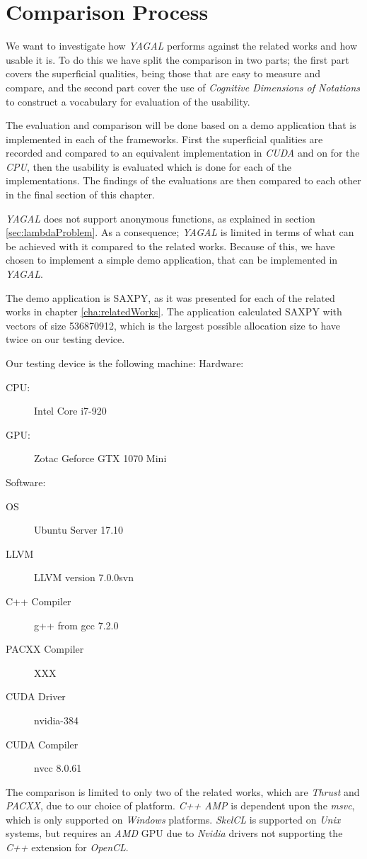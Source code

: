 \section{Comparison Process}
We want to investigate how \textit{YAGAL} performs against the related works and how usable it is. To do this we have split the comparison in two parts; the first part covers the superficial qualities, being those that are easy to measure and compare, and the second part cover the use of \textit{Cognitive Dimensions of Notations} to construct a vocabulary for evaluation of the usability.

The evaluation and comparison will be done based on a demo application that is implemented in each of the frameworks. First the superficial qualities are recorded and compared to an equivalent implementation in \textit{CUDA} and on for the \textit{CPU}, then the usability is evaluated which is done for each of the implementations. The findings of the evaluations are then compared to each other in the final section of this chapter.

\textit{YAGAL} does not support anonymous functions, as explained in section \ref{sec:lambdaProblem}. As a consequence; \textit{YAGAL} is limited in terms of what can be achieved with it compared to the related works. Because of this, we have chosen to implement a simple demo application, that can be implemented in \textit{YAGAL}. 

The demo application is SAXPY, as it was presented for each of the related works in chapter \ref{cha:relatedWorks}. The application calculated SAXPY with vectors of size 536870912, which is the largest possible allocation size to have twice on our testing device.

Our testing device is the following machine:
Hardware:
\begin{description}
\item[CPU:] Intel Core i7-920
\item[GPU:] Zotac Geforce GTX 1070 Mini
\end{description}

Software:
\begin{description}
\item[OS] Ubuntu Server 17.10
\item[LLVM] LLVM version  7.0.0svn
\item[C++ Compiler] g++ from gcc 7.2.0
\item[PACXX Compiler] XXX
\item[CUDA Driver] nvidia-384
\item[CUDA Compiler] nvcc 8.0.61
\end{description}


The comparison is limited to only two of the related works, which are \textit{Thrust} and \textit{PACXX}, due to our choice of platform. \textit{C++ AMP} is dependent upon the \textit{msvc}, which is only supported on \textit{Windows} platforms. \textit{SkelCL} is supported on \textit{Unix} systems, but requires an \textit{AMD} GPU due to \textit{Nvidia} drivers not supporting the \textit{C++} extension for \textit{OpenCL}.
